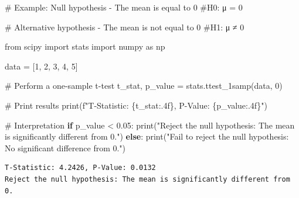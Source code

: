 \documentclass[
  letterpaper,
  DIV=11,
  numbers=noendperiod]{scrreprt}
\newenvironment{Shaded}{\begin{snugshade}}{\end{snugshade}}
\newcommand{\BuiltInTok}[1]{\textcolor[rgb]{0.00,0.23,0.31}{#1}}
\newcommand{\CommentTok}[1]{\textcolor[rgb]{0.37,0.37,0.37}{#1}}
\newcommand{\ControlFlowTok}[1]{\textcolor[rgb]{0.00,0.23,0.31}{\textbf{#1}}}
\newcommand{\DecValTok}[1]{\textcolor[rgb]{0.68,0.00,0.00}{#1}}
\newcommand{\FloatTok}[1]{\textcolor[rgb]{0.68,0.00,0.00}{#1}}
\newcommand{\ImportTok}[1]{\textcolor[rgb]{0.00,0.46,0.62}{#1}}
\newcommand{\NormalTok}[1]{\textcolor[rgb]{0.00,0.23,0.31}{#1}}
\newcommand{\OperatorTok}[1]{\textcolor[rgb]{0.37,0.37,0.37}{#1}}
\newcommand{\SpecialCharTok}[1]{\textcolor[rgb]{0.37,0.37,0.37}{#1}}
\newcommand{\SpecialStringTok}[1]{\textcolor[rgb]{0.13,0.47,0.30}{#1}}
\newcommand{\StringTok}[1]{\textcolor[rgb]{0.13,0.47,0.30}{#1}}
\begin{document}
\begin{Shaded}
\begin{Highlighting}[]
\CommentTok{\# Example: Null hypothesis {-} The mean is equal to 0}
\CommentTok{\#H0: μ = 0}

\CommentTok{\# Alternative hypothesis {-} The mean is not equal to 0}
\CommentTok{\#H1: μ ≠ 0}

\ImportTok{from}\NormalTok{ scipy }\ImportTok{import}\NormalTok{ stats}
\ImportTok{import}\NormalTok{ numpy }\ImportTok{as}\NormalTok{ np}

\NormalTok{data }\OperatorTok{=}\NormalTok{ [}\DecValTok{1}\NormalTok{, }\DecValTok{2}\NormalTok{, }\DecValTok{3}\NormalTok{, }\DecValTok{4}\NormalTok{, }\DecValTok{5}\NormalTok{]}

\CommentTok{\# Perform a one{-}sample t{-}test}
\NormalTok{t\_stat, p\_value }\OperatorTok{=}\NormalTok{ stats.ttest\_1samp(data, }\DecValTok{0}\NormalTok{)}

\CommentTok{\# Print results}
\BuiltInTok{print}\NormalTok{(}\SpecialStringTok{f"T{-}Statistic: }\SpecialCharTok{\{}\NormalTok{t\_stat}\SpecialCharTok{:.4f\}}\SpecialStringTok{, P{-}Value: }\SpecialCharTok{\{}\NormalTok{p\_value}\SpecialCharTok{:.4f\}}\SpecialStringTok{"}\NormalTok{)}

\CommentTok{\# Interpretation}
\ControlFlowTok{if}\NormalTok{ p\_value }\OperatorTok{\textless{}} \FloatTok{0.05}\NormalTok{:}
    \BuiltInTok{print}\NormalTok{(}\StringTok{"Reject the null hypothesis: The mean is significantly different from 0."}\NormalTok{)}
\ControlFlowTok{else}\NormalTok{:}
    \BuiltInTok{print}\NormalTok{(}\StringTok{"Fail to reject the null hypothesis: No significant difference from 0."}\NormalTok{)}
\end{Highlighting}
\end{Shaded}

\begin{verbatim}
T-Statistic: 4.2426, P-Value: 0.0132
Reject the null hypothesis: The mean is significantly different from 0.
\end{verbatim}
\end{document}
